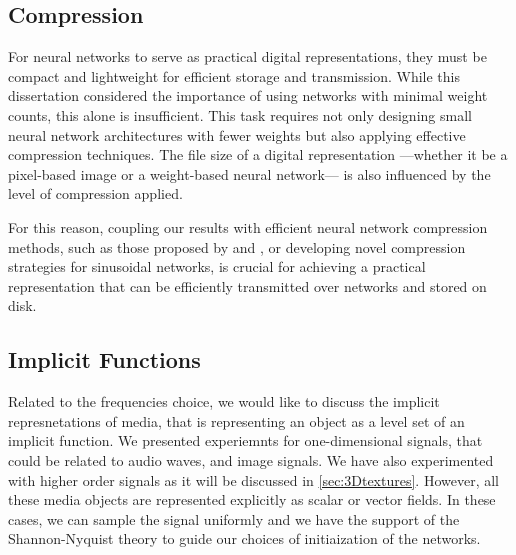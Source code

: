 \subsection{Compression}


For neural networks to serve as practical digital representations, they must be compact and lightweight for efficient storage and transmission. While this dissertation considered the importance of using networks with minimal weight counts, this alone is insufficient. This task requires not only designing small neural network architectures with fewer weights but also applying effective compression techniques. The file size of a digital representation —whether it be a pixel-based image or a weight-based neural network— is also influenced by the level of compression applied.

For this reason, coupling our results with efficient neural network compression methods, such as those proposed by \cite{dupont2021coin} and \cite{dupont2022coinpp}, or developing novel compression strategies for sinusoidal networks, is crucial for achieving a practical representation that can be efficiently transmitted over networks and stored on disk.


\subsection{Implicit Functions}

Related to the frequencies choice, we would like to discuss the implicit represnetations of media, that is representing an object as a level set of an implicit function. We presented experiemnts for one-dimensional signals, that could be related to audio waves, and image signals. We have also experimented with higher order signals as it will be discussed in \ref{sec:3Dtextures}. However, all these media objects are represented explicitly as scalar or vector fields. In these cases, we can sample the signal uniformly and we have the support of the Shannon-Nyquist theory to guide our choices of initiaization of the networks.

